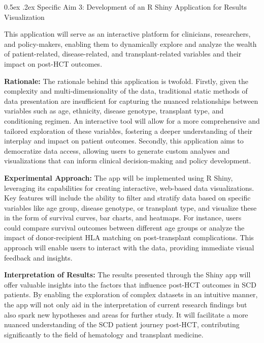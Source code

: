 \documentclass[11pt,]{article}
\makeatletter
\renewcommand\subsection{
  \@startsection{subsection}{2}{\z@}
    {-1.5ex\@plus -1ex \@minus -.2ex}%
    {0.5ex \@plus .2ex}%
    {\normalfont\normalsize\bf}} %
\makeatother
\begin{document}
\hypertarget{specific-aim-3-development-of-an-r-shiny-application-for-results-visualization}{%
\subsection{Specific Aim 3: Development of an R Shiny Application for
Results
Visualization}\label{specific-aim-3-development-of-an-r-shiny-application-for-results-visualization}}

This application will serve as an interactive platform for clinicians,
researchers, and policy-makers, enabling them to dynamically explore and
analyze the wealth of patient-related, disease-related, and
transplant-related variables and their impact on post-HCT outcomes.

\textbf{Rationale:} The rationale behind this application is twofold.
Firstly, given the complexity and multi-dimensionality of the data,
traditional static methods of data presentation are insufficient for
capturing the nuanced relationships between variables such as age,
ethnicity, disease genotype, transplant type, and conditioning regimen.
An interactive tool will allow for a more comprehensive and tailored
exploration of these variables, fostering a deeper understanding of
their interplay and impact on patient outcomes. Secondly, this
application aims to democratize data access, allowing users to generate
custom analyses and visualizations that can inform clinical
decision-making and policy development.

\textbf{Experimental Approach: }The app will be implemented using R
Shiny, leveraging its capabilities for creating interactive, web-based
data visualizations. Key features will include the ability to filter and
stratify data based on specific variables like age group, disease
genotype, or transplant type, and visualize these in the form of
survival curves, bar charts, and heatmaps. For instance, users could
compare survival outcomes between different age groups or analyze the
impact of donor-recipient HLA matching on post-transplant complications.
This approach will enable users to interact with the data, providing
immediate visual feedback and insights.

\textbf{Interpretation of Results:} The results presented through the
Shiny app will offer valuable insights into the factors that influence
post-HCT outcomes in SCD patients. By enabling the exploration of
complex datasets in an intuitive manner, the app will not only aid in
the interpretation of current research findings but also spark new
hypotheses and areas for further study. It will facilitate a more
nuanced understanding of the SCD patient journey post-HCT, contributing
significantly to the field of hematology and transplant medicine.
\end{document}
